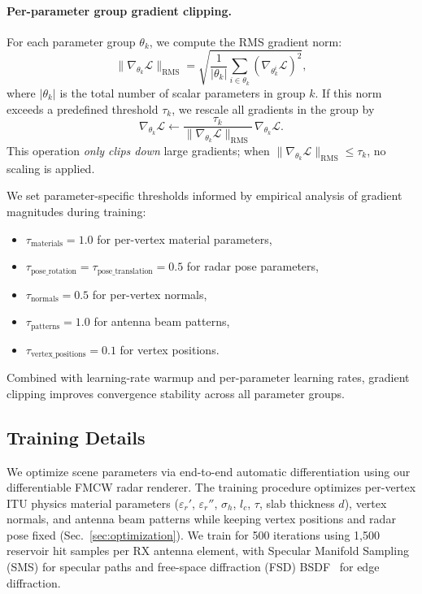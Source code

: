 \paragraph{Per-parameter group gradient clipping.}
For each parameter group $\theta_k$, we compute the RMS gradient norm:
\begin{equation}
    \|\nabla_{\theta_k} \mathcal{L}\|_{\text{RMS}} = \sqrt{\frac{1}{|\theta_k|} \sum_{i \in \theta_k} (\nabla_{\theta_k^i} \mathcal{L})^2},
\end{equation}
where $|\theta_k|$ is the total number of scalar parameters in group $k$. If this norm exceeds a predefined threshold $\tau_k$, we rescale all gradients in the group by
\begin{equation}
    \nabla_{\theta_k} \mathcal{L} \leftarrow \frac{\tau_k}{\|\nabla_{\theta_k} \mathcal{L}\|_{\text{RMS}}} \, \nabla_{\theta_k} \mathcal{L}.
\end{equation}
This operation \emph{only clips down} large gradients; when $\|\nabla_{\theta_k} \mathcal{L}\|_{\text{RMS}} \leq \tau_k$, no scaling is applied.

We set parameter-specific thresholds informed by empirical analysis of gradient magnitudes during training:
\begin{itemize}
    \item $\tau_{\text{materials}} = 1.0$ for per-vertex material parameters,
    \item $\tau_{\text{pose\_rotation}} = \tau_{\text{pose\_translation}} = 0.5$ for radar pose parameters,
    \item $\tau_{\text{normals}} = 0.5$ for per-vertex normals,
    \item $\tau_{\text{patterns}} = 1.0$ for antenna beam patterns,
    \item $\tau_{\text{vertex\_positions}} = 0.1$ for vertex positions.
\end{itemize}
Combined with learning-rate warmup and per-parameter learning rates, gradient clipping improves convergence stability across all parameter groups.

\subsection{Training Details}
\label{sec:supp_training}

We optimize scene parameters via end-to-end automatic differentiation using our differentiable FMCW radar renderer. The training procedure optimizes per-vertex ITU physics material parameters ($\varepsilon_r'$, $\varepsilon_r''$, $\sigma_h$, $l_c$, $\tau$, slab thickness $d$), vertex normals, and antenna beam patterns while keeping vertex positions and radar pose fixed (Sec.~\ref{sec:optimization}). We train for 500 iterations using 1,500 reservoir hit samples per RX antenna element, with Specular Manifold Sampling (SMS) for specular paths and free-space diffraction (FSD) BSDF~\cite{steinberg2024fsd} for edge diffraction.

